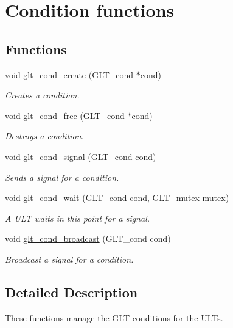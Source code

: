 \hypertarget{group__CONDITION}{\section{Condition functions}
\label{group__CONDITION}
}
\subsection*{Functions}
\begin{DoxyCompactItemize}
\item 
void \hyperlink{group__CONDITION_ga0067216e7953ac7b093d998ab6afac55}{glt\-\_\-cond\-\_\-create} (G\-L\-T\-\_\-cond $\ast$cond)
\begin{DoxyCompactList}\small\item\em Creates a condition. \end{DoxyCompactList}\item 
void \hyperlink{group__CONDITION_ga7186f2e869bbb87171a5c4562ac752a5}{glt\-\_\-cond\-\_\-free} (G\-L\-T\-\_\-cond $\ast$cond)
\begin{DoxyCompactList}\small\item\em Destroys a condition. \end{DoxyCompactList}\item 
void \hyperlink{group__CONDITION_gaec5c2587a96261c51d2e1f40e3d21fcd}{glt\-\_\-cond\-\_\-signal} (G\-L\-T\-\_\-cond cond)
\begin{DoxyCompactList}\small\item\em Sends a signal for a condition. \end{DoxyCompactList}\item 
void \hyperlink{group__CONDITION_ga0701bd2c880a4dbd1d282e2c9aa21ea1}{glt\-\_\-cond\-\_\-wait} (G\-L\-T\-\_\-cond cond, G\-L\-T\-\_\-mutex mutex)
\begin{DoxyCompactList}\small\item\em A U\-L\-T waits in this point for a signal. \end{DoxyCompactList}\item 
void \hyperlink{group__CONDITION_gaf36e80119d53bc57a0347e3b42b0425f}{glt\-\_\-cond\-\_\-broadcast} (G\-L\-T\-\_\-cond cond)
\begin{DoxyCompactList}\small\item\em Broadcast a signal for a condition. \end{DoxyCompactList}\end{DoxyCompactItemize}


\subsection{Detailed Description}
These functions manage the G\-L\-T conditions for the U\-L\-Ts. 

